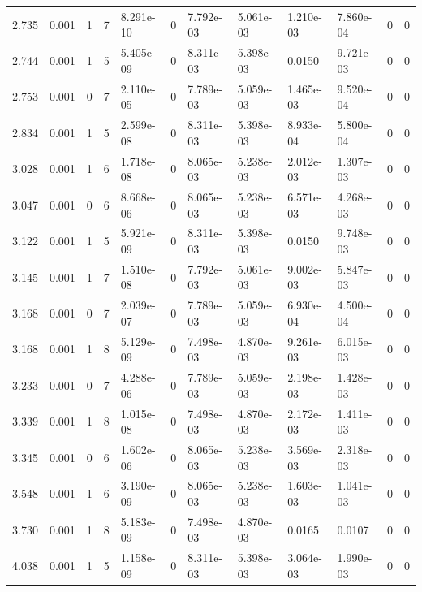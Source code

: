 \documentclass[preview]{standalone}
\begin{document}
{{\begin{tabular}{L{1.2cm}C{1.2cm} C{0.3cm}C{0.5cm} C{1.4cm}C{1.4cm} C{1.4cm}C{1.4cm} C{1.6cm}C{1.6cm} C{1.6cm}C{1.6cm}}
  2.735  &  0.001  & 1     &  7 &  8.291e-10  & 0  &  7.792e-03&   5.061e-03& 1.210e-03 & 7.860e-04   &  0 & 0  \\ 
  2.744  &  0.001  & 1     &  5 &  5.405e-09  & 0  &  8.311e-03&   5.398e-03& 0.0150 & 9.721e-03   &  0 & 0  \\ 
  2.753  &  0.001  & 0     &  7 &  2.110e-05  & 0  &  7.789e-03&   5.059e-03& 1.465e-03 & 9.520e-04   &  0 & 0  \\ 
  2.834  &  0.001  & 1     &  5 &  2.599e-08  & 0  &  8.311e-03&   5.398e-03& 8.933e-04 & 5.800e-04   &  0 & 0  \\ 
  3.028  &  0.001  & 1     &  6 &  1.718e-08  & 0  &  8.065e-03&   5.238e-03& 2.012e-03 & 1.307e-03   &  0 & 0  \\ 
  3.047  &  0.001  & 0     &  6 &  8.668e-06  & 0  &  8.065e-03&   5.238e-03& 6.571e-03 & 4.268e-03   &  0 & 0  \\ 
  3.122  &  0.001  & 1     &  5 &  5.921e-09  & 0  &  8.311e-03&   5.398e-03& 0.0150 & 9.748e-03   &  0 & 0  \\ 
  3.145  &  0.001  & 1     &  7 &  1.510e-08  & 0  &  7.792e-03&   5.061e-03& 9.002e-03 & 5.847e-03   &  0 & 0  \\ 
  3.168  &  0.001  & 0     &  7 &  2.039e-07  & 0  &  7.789e-03&   5.059e-03& 6.930e-04 & 4.500e-04   &  0 & 0  \\ 
  3.168  &  0.001  & 1     &  8 &  5.129e-09  & 0  &  7.498e-03&   4.870e-03& 9.261e-03 & 6.015e-03   &  0 & 0  \\ 
  3.233  &  0.001  & 0     &  7 &  4.288e-06  & 0  &  7.789e-03&   5.059e-03& 2.198e-03 & 1.428e-03   &  0 & 0  \\ 
  3.339  &  0.001  & 1     &  8 &  1.015e-08  & 0  &  7.498e-03&   4.870e-03& 2.172e-03 & 1.411e-03   &  0 & 0  \\ 
  3.345  &  0.001  & 0     &  6 &  1.602e-06  & 0  &  8.065e-03&   5.238e-03& 3.569e-03 & 2.318e-03   &  0 & 0  \\ 
  3.548  &  0.001  & 1     &  6 &  3.190e-09  & 0  &  8.065e-03&   5.238e-03& 1.603e-03 & 1.041e-03   &  0 & 0  \\ 
  3.730  &  0.001  & 1     &  8 &  5.183e-09  & 0  &  7.498e-03&   4.870e-03& 0.0165 & 0.0107   &  0 & 0  \\ 
  4.038  &  0.001  & 1     &  5 &  1.158e-09  & 0  &  8.311e-03&   5.398e-03& 3.064e-03 & 1.990e-03   &  0 & 0  \\ 
\hline 
\end{tabular} 

}}
\end{document}
